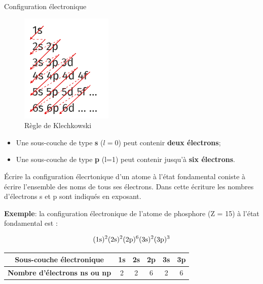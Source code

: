 \documentclass[french]{article}
\begin{document}
\begin{definition}{Configuration électronique}
	\begin{figure}
		\centering
		\includegraphics[width=.2\textwidth]{Klechkowski.png}
		\caption{Règle de Klechkowski}
	\end{figure}
	\bigskip

	\dotfill \bigskip
	
	\dotfill \bigskip

	\dotfill \bigskip

	\dotfill

	\begin{itemize}
		\item Une sous-couche de type \textbf{s} ($l=0$) peut contenir \textbf{deux électrons};
		\item Une sous-couche de type \textbf{p} (l=1) peut contenir jusqu'à \textbf{six électrons}.
	\end{itemize}
\end{definition}

Écrire la configuration élecrtonique d'un atome à l'état fondamental coniste à écrire l'ensemble des noms de tous ses électrons. Dans cette écriture les nombres d'électrons s et p sont indiqués en exposant.\medskip

\clearpage
\noindent \textbf{Exemple}: la configuration électronique de l'atome de phosphore  (Z = 15) à l'état fondamental est :\bigskip 


\[ \rm (1s)^2(2s)^2(2p)^6(3s)^2(3p)^3\]
\begin{table}[ht]
	\centering
	\begin{tabular}{|c|c|c|c|c|c|}
		\hline 
		\textbf{Sous-couche électronique} & 1s & 2s & 2p & 3s & 3p \\ \hline
		\textbf{Nombre d'électrons ns ou np} & 2 & 2 & 6 & 2 & 6 \\ \hline 
	\end{tabular}
\end{table}
\end{document}
